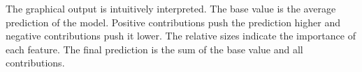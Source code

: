 The graphical output is intuitively interpreted. The base value is the average prediction of the model. Positive contributions push the prediction higher and negative contributions push it lower. The relative sizes indicate the importance of each feature. The final prediction is the sum of the base value and all contributions.